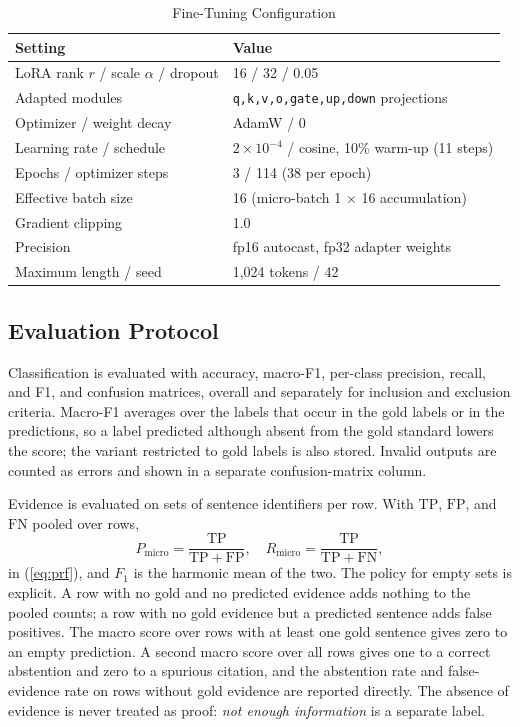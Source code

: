 \documentclass[conference]{IEEEtran}
\begin{document}
\begin{table}[!t]
\caption{Fine-Tuning Configuration}
\label{tab:train}
\centering
\footnotesize
\begin{tabular}{L{0.34\columnwidth}L{0.52\columnwidth}}
\toprule
Setting & Value \\
\midrule
LoRA rank $r$ / scale $\alpha$ / dropout & 16 / 32 / 0.05 \\
Adapted modules & \texttt{q,k,v,o,gate,up,down} projections \\
Optimizer / weight decay & AdamW / 0 \\
Learning rate / schedule & $2\times10^{-4}$ / cosine, 10\% warm-up (11 steps) \\
Epochs / optimizer steps & 3 / 114 (38 per epoch) \\
Effective batch size & 16 (micro-batch 1 $\times$ 16 accumulation) \\
Gradient clipping & 1.0 \\
Precision & fp16 autocast, fp32 adapter weights \\
Maximum length / seed & 1,024 tokens / 42 \\
\bottomrule
\end{tabular}
\end{table}

\subsection{Evaluation Protocol}
Classification is evaluated with accuracy, macro-F1, per-class precision, recall, and F1, and confusion matrices, overall and separately for inclusion and exclusion criteria. Macro-F1 averages over the labels that occur in the gold labels or in the predictions, so a label predicted although absent from the gold standard lowers the score; the variant restricted to gold labels is also stored. Invalid outputs are counted as errors and shown in a separate confusion-matrix column.

Evidence is evaluated on sets of sentence identifiers per row. With $\mathrm{TP}$, $\mathrm{FP}$, and $\mathrm{FN}$ pooled over rows,
\begin{equation}
P_{\text{micro}}=\frac{\mathrm{TP}}{\mathrm{TP}+\mathrm{FP}},\quad R_{\text{micro}}=\frac{\mathrm{TP}}{\mathrm{TP}+\mathrm{FN}},
\label{eq:prf}
\end{equation}
in (\ref{eq:prf}), and $F_1$ is the harmonic mean of the two. The policy for empty sets is explicit. A row with no gold and no predicted evidence adds nothing to the pooled counts; a row with no gold evidence but a predicted sentence adds false positives. The macro score over rows with at least one gold sentence gives zero to an empty prediction. A second macro score over all rows gives one to a correct abstention and zero to a spurious citation, and the abstention rate and false-evidence rate on rows without gold evidence are reported directly. The absence of evidence is never treated as proof: \emph{not enough information} is a separate label.
\end{document}
